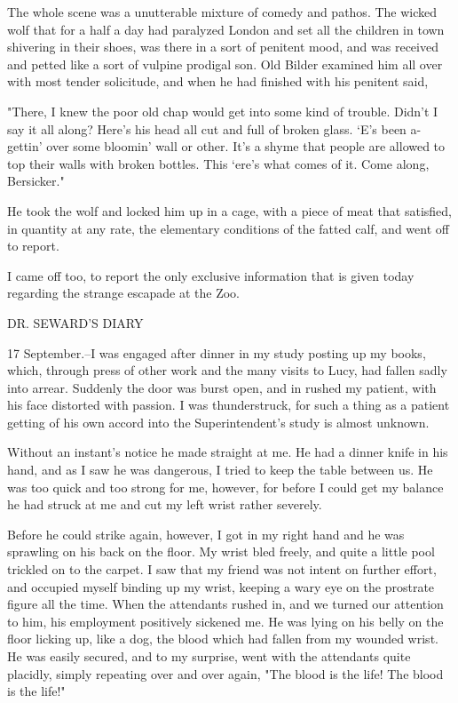 The whole scene was a unutterable mixture of comedy and pathos. The wicked wolf that for a half a day had paralyzed London and set all the children in town shivering in their shoes, was there in a sort of penitent mood, and was received and petted like a sort of vulpine prodigal son. Old Bilder examined him all over with most tender solicitude, and when he had finished with his penitent said, 

"There, I knew the poor old chap would get into some kind of trouble. Didn't I say it all along? Here's his head all cut and full of broken glass. `E's been a-gettin' over some bloomin' wall or other. It's a shyme that people are allowed to top their walls with broken bottles. This `ere's what comes of it. Come along, Bersicker." 

He took the wolf and locked him up in a cage, with a piece of meat that satisfied, in quantity at any rate, the elementary conditions of the fatted calf, and went off to report. 

I came off too, to report the only exclusive information that is given today regarding the strange escapade at the Zoo. 

DR. SEWARD'S DIARY 

17 September.--I was engaged after dinner in my study posting up my books, which, through press of other work and the many visits to Lucy, had fallen sadly into arrear. Suddenly the door was burst open, and in rushed my patient, with his face distorted with passion. I was thunderstruck, for such a thing as a patient getting of his own accord into the Superintendent's study is almost unknown. 

Without an instant's notice he made straight at me. He had a dinner knife in his hand, and as I saw he was dangerous, I tried to keep the table between us. He was too quick and too strong for me, however, for before I could get my balance he had struck at me and cut my left wrist rather severely. 

Before he could strike again, however, I got in my right hand and he was sprawling on his back on the floor. My wrist bled freely, and quite a little pool trickled on to the carpet. I saw that my friend was not intent on further effort, and occupied myself binding up my wrist, keeping a wary eye on the prostrate figure all the time. When the attendants rushed in, and we turned our attention to him, his employment positively sickened me. He was lying on his belly on the floor licking up, like a dog, the blood which had fallen from my wounded wrist. He was easily secured, and to my surprise, went with the attendants quite placidly, simply repeating over and over again, "The blood is the life! The blood is the life!" 

